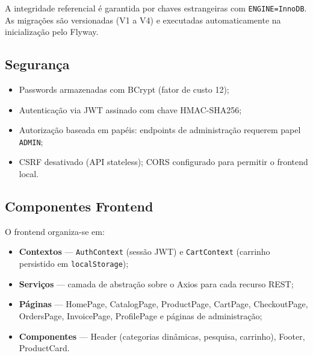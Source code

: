 A integridade referencial é garantida por chaves estrangeiras com \texttt{ENGINE=InnoDB}. As migrações são versionadas (V1 a V4) e executadas automaticamente na inicialização pelo Flyway.

\subsection{Segurança}

\begin{itemize}
    \item Passwords armazenadas com BCrypt (fator de custo 12);
    \item Autenticação via JWT assinado com chave HMAC-SHA256;
    \item Autorização baseada em papéis: endpoints de administração requerem papel \texttt{ADMIN};
    \item CSRF desativado (API stateless); CORS configurado para permitir o frontend local.
\end{itemize}

\subsection{Componentes Frontend}

O frontend organiza-se em:
\begin{itemize}
    \item \textbf{Contextos} — \texttt{AuthContext} (sessão JWT) e \texttt{CartContext} (carrinho persistido em \texttt{localStorage});
    \item \textbf{Serviços} — camada de abstração sobre o Axios para cada recurso REST;
    \item \textbf{Páginas} — HomePage, CatalogPage, ProductPage, CartPage, CheckoutPage, OrdersPage, InvoicePage, ProfilePage e páginas de administração;
    \item \textbf{Componentes} — Header (categorias dinâmicas, pesquisa, carrinho), Footer, ProductCard.
\end{itemize}
